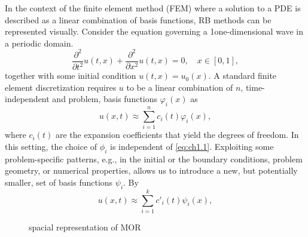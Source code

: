 In the context of the finite element method (FEM) where a solution to a PDE is described as a linear combination of basis functions, RB methods can be represented visually. Consider the equation governing a 1one-dimensional wave in a periodic domain.
\begin{equation} \label{eq:ch1.1}
	\frac{\partial^2 }{\partial t^2} u(t,x) + \frac{\partial^2 }{\partial x^2} u(t,x) = 0, \quad x\in[0,1],
\end{equation}
together with some initial condition $u(t,x) = u_0(x)$. A standard finite element discretization requires $u$ to be a linear combination of $n$, time-independent and problem, basis functions $\varphi_i(x)$ as
\begin{equation} \label{eq:ch1.2}
	u(x,t) \approx \sum_{i=1}^n c_i(t) \varphi_i(x),
\end{equation}
where $c_i(t)$ are the expansion coefficients that yield the degrees of freedom. In this setting, the choice of $\phi_i$ is independent of \eqref{eq:ch1.1}. Exploiting some problem-specific patterns, e.g., in the initial or the boundary conditions, problem geometry, or numerical properties, allows us to introduce a new, but potentially smaller, set of basis functions $\psi_i$. By
\begin{equation} \label{eq:ch1.3}
	u(x,t) \approx \sum_{i=1}^k c'_i(t) \psi_i(x),
\end{equation}
\begin{figure} [t]
	\caption{spacial representation of MOR}
	\label{fig:ch1.1}
\end{figure}
